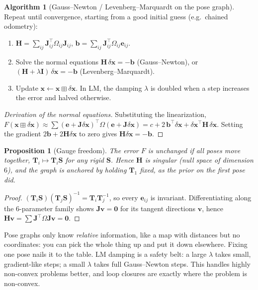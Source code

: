 \documentclass[11pt,a4paper]{article}
\newcommand{\be}{\mathbf{e}}
\newcommand{\bH}{\mathbf{H}}
\newcommand{\bb}{\mathbf{b}}
\newcommand{\bJ}{\mathbf{J}}
\newcommand{\bI}{\mathbf{I}}
\newcommand{\bT}{\mathbf{T}}
\theoremstyle{definition}
\newtheorem{algorithm}{Algorithm}[section]
\theoremstyle{plain}
\newtheorem{proposition}[definition]{Proposition}
\theoremstyle{remark}
\begin{document}
\begin{algorithm}[Gauss--Newton / Levenberg--Marquardt on the pose graph]\label{alg:gn}
Repeat until convergence, starting from a good initial guess (e.g.\ chained odometry):
\begin{enumerate}[nosep]
\item $\bH=\sum_{ij}\bJ_{ij}^\top\Omega_{ij}\bJ_{ij}$, \quad $\bb=\sum_{ij}\bJ_{ij}^\top\Omega_{ij}\be_{ij}$.
\item Solve the normal equations $\bH\,\delta\mathbf x=-\bb$ (Gauss--Newton), or $(\bH+\lambda\bI)\,\delta\mathbf x=-\bb$ (Levenberg--Marquardt).
\item Update $\mathbf x\leftarrow\mathbf x\boxplus\delta\mathbf x$. In LM, the damping $\lambda$ is doubled when a step increases the error and halved otherwise.
\end{enumerate}
\end{algorithm}
\begin{proof}[Derivation of the normal equations]
Substituting the linearization, $F(\mathbf x\boxplus\delta\mathbf x)\approx\sum(\be+\bJ\delta\mathbf x)^\top\Omega(\be+\bJ\delta\mathbf x)=c+2\,\bb^\top\delta\mathbf x+\delta\mathbf x^\top\bH\,\delta\mathbf x$. Setting the gradient $2\bb+2\bH\delta\mathbf x$ to zero gives $\bH\delta\mathbf x=-\bb$. \qedhere
\end{proof}

\begin{proposition}[Gauge freedom]\label{prop:gauge}
The error $F$ is unchanged if all poses move together, $\bT_i\mapsto\bT_i\mathbf S$ for any rigid $\mathbf S$. Hence $\bH$ is singular (null space of dimension $6$), and the graph is anchored by holding $\bT_1$ fixed, as the prior on the first pose did.
\end{proposition}
\begin{proof}
$(\bT_i\mathbf S)(\bT_j\mathbf S)^{-1}=\bT_i\bT_j^{-1}$, so every $\be_{ij}$ is invariant. Differentiating along the 6-parameter family shows $\bJ\mathbf v=\mathbf 0$ for its tangent directions $\mathbf v$, hence $\bH\mathbf v=\sum\bJ^\top\Omega\bJ\mathbf v=\mathbf 0$. \qedhere
\end{proof}
\begin{intuition}
Pose graphs only know \emph{relative} information, like a map with distances but no coordinates: you can pick the whole thing up and put it down elsewhere. Fixing one pose nails it to the table. LM damping is a safety belt: a large $\lambda$ takes small, gradient-like steps; a small $\lambda$ takes full Gauss--Newton steps. This handles highly non-convex problems better, and loop closures are exactly where the problem is non-convex.
\end{intuition}
\end{document}
